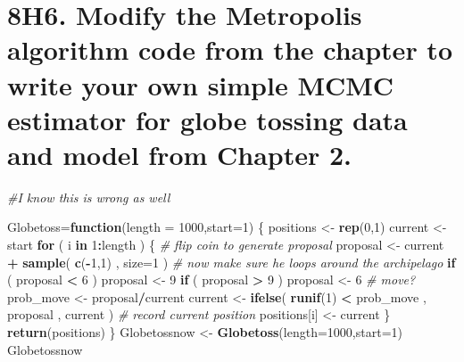 \documentclass[]{article}
\newenvironment{Shaded}{\begin{snugshade}}{\end{snugshade}}
\newcommand{\KeywordTok}[1]{\textcolor[rgb]{0.13,0.29,0.53}{\textbf{#1}}}
\newcommand{\DataTypeTok}[1]{\textcolor[rgb]{0.13,0.29,0.53}{#1}}
\newcommand{\DecValTok}[1]{\textcolor[rgb]{0.00,0.00,0.81}{#1}}
\newcommand{\StringTok}[1]{\textcolor[rgb]{0.31,0.60,0.02}{#1}}
\newcommand{\CommentTok}[1]{\textcolor[rgb]{0.56,0.35,0.01}{\textit{#1}}}
\newcommand{\ControlFlowTok}[1]{\textcolor[rgb]{0.13,0.29,0.53}{\textbf{#1}}}
\newcommand{\OperatorTok}[1]{\textcolor[rgb]{0.81,0.36,0.00}{\textbf{#1}}}
\newcommand{\NormalTok}[1]{#1}
\begin{document}
\section{8H6. Modify the Metropolis algorithm code from the chapter to
write your own simple MCMC estimator for globe tossing data and model
from Chapter
2.}\label{h6.-modify-the-metropolis-algorithm-code-from-the-chapter-to-write-your-own-simple-mcmc-estimator-for-globe-tossing-data-and-model-from-chapter-2.}

\begin{Shaded}
\begin{Highlighting}[]
\CommentTok{#I know this is wrong as well}

\NormalTok{Globetoss=}\ControlFlowTok{function}\NormalTok{(}\DataTypeTok{length =} \DecValTok{1000}\NormalTok{,}\DataTypeTok{start=}\DecValTok{1}\NormalTok{)}
\NormalTok{\{}
\NormalTok{positions <-}\StringTok{ }\KeywordTok{rep}\NormalTok{(}\DecValTok{0}\NormalTok{,}\DecValTok{1}\NormalTok{)}
\NormalTok{current <-}\StringTok{ }\NormalTok{start}
\ControlFlowTok{for}\NormalTok{ ( i }\ControlFlowTok{in} \DecValTok{1}\OperatorTok{:}\NormalTok{length ) \{}
  \CommentTok{# flip coin to generate proposal}
\NormalTok{  proposal <-}\StringTok{ }\NormalTok{current }\OperatorTok{+}\StringTok{ }\KeywordTok{sample}\NormalTok{( }\KeywordTok{c}\NormalTok{(}\OperatorTok{-}\DecValTok{1}\NormalTok{,}\DecValTok{1}\NormalTok{) , }\DataTypeTok{size=}\DecValTok{1}\NormalTok{ )}
  \CommentTok{# now make sure he loops around the archipelago}
  \ControlFlowTok{if}\NormalTok{ ( proposal }\OperatorTok{<}\StringTok{ }\DecValTok{6}\NormalTok{ )  proposal <-}\StringTok{ }\DecValTok{9}
  \ControlFlowTok{if}\NormalTok{ ( proposal }\OperatorTok{>}\StringTok{ }\DecValTok{9}\NormalTok{ ) proposal <-}\StringTok{ }\DecValTok{6}
  \CommentTok{# move?}
\NormalTok{  prob_move <-}\StringTok{ }\NormalTok{proposal}\OperatorTok{/}\NormalTok{current}
\NormalTok{  current <-}\StringTok{ }\KeywordTok{ifelse}\NormalTok{( }\KeywordTok{runif}\NormalTok{(}\DecValTok{1}\NormalTok{) }\OperatorTok{<}\StringTok{ }\NormalTok{prob_move , proposal , current )}
  \CommentTok{# record current position}
\NormalTok{  positions[i] <-}\StringTok{ }\NormalTok{current}
\NormalTok{\}}
\KeywordTok{return}\NormalTok{(positions)}
\NormalTok{\}}
\NormalTok{Globetossnow <-}\StringTok{ }\KeywordTok{Globetoss}\NormalTok{(}\DataTypeTok{length=}\DecValTok{1000}\NormalTok{,}\DataTypeTok{start=}\DecValTok{1}\NormalTok{)}
\NormalTok{Globetossnow}
\end{Highlighting}
\end{Shaded}
\end{document}
